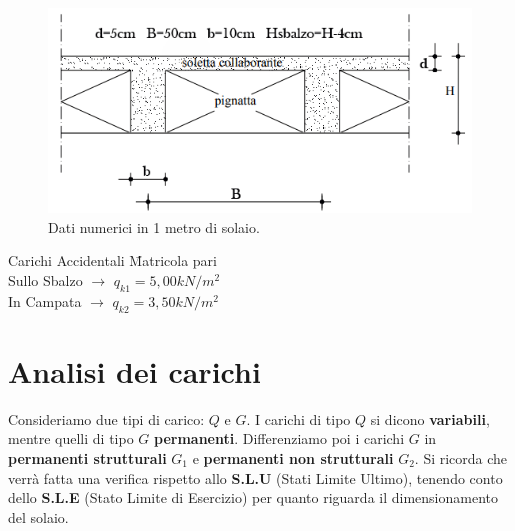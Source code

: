 \documentclass[a4paper,12pt, oneside]{book}
\begin{document}
	\begin{figure}[H]
		\hspace*{-.4cm}
		\centering
		\includegraphics[width=0.7\linewidth]{"immagini/misure solaio flessione normale 2"}
		\caption{Dati numerici in 1 metro di solaio.}
		\label{fig:misure-solaio-flessione-normale}
	\end{figure}
	
	\begin{tabbing}
		Carichi Accidentali \hspace{10em} \= Matricola pari \hspace{1em} \\
		Sullo Sbalzo $\longrightarrow$    \> $q_{k1}=5,00kN/m^{2}$    \\
		In Campata   $\longrightarrow$    \> $q_{k2}=3,50kN/m^{2}$                     
	\end{tabbing}
	\chapter{Analisi dei carichi}
	
	Consideriamo due tipi di carico: $Q$ e $G$. I carichi di tipo $Q$ si dicono \textbf{variabili}, mentre quelli di tipo $G$ \textbf{permanenti}. Differenziamo poi i carichi $G$ in \textbf{permanenti strutturali} $G_1$ e \textbf{permanenti non strutturali} $G_2$.
    \leavevmode\newline
    \leavevmode\newline
	Si ricorda che verrà fatta una verifica rispetto allo \textbf{S.L.U} (Stati Limite Ultimo), tenendo conto dello \textbf{S.L.E} (Stato Limite di Esercizio) per quanto riguarda il dimensionamento del solaio.
\end{document}
